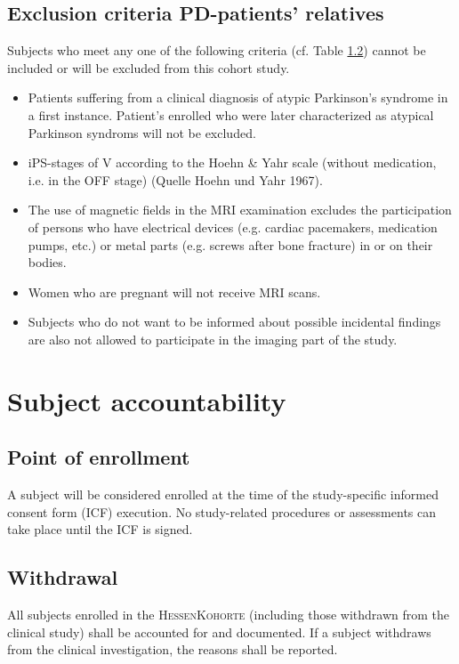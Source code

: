\documentclass[
	a4paper, 
	11.5pt,
	headings=small, 
	twoside, 
	titlepage=firstiscover, 
 	pagesize=auto,
  	version=last,
	open=any,
	BCOR=14mm,
  	chapterprefix=false]{scrbook}
\begin{document}
\subsection{Exclusion criteria \ac{PD}-patients' relatives}
\label{sec:exclusion_criteriaREL}
Subjects who meet any one of the following criteria (cf. Table \ref{}) cannot be included or will be excluded from this cohort study.
\begin{itemize}
\item Patients suffering from a clinical diagnosis of atypic Parkinson's syndrome in a first instance. Patient's enrolled who were later characterized as atypical Parkinson syndroms will not be excluded.
\item \ac{iPS}-stages of V according to the Hoehn \& Yahr scale (without medication, i.e. in the OFF stage) (Quelle Hoehn und Yahr 1967).
\item The use of magnetic fields in the MRI examination excludes the participation of persons who have electrical devices (e.g. cardiac pacemakers, medication pumps, etc.) or metal parts (e.g. screws after bone fracture) in or on their bodies. 
\item Women who are pregnant will not receive \ac{MRI} scans.
\item Subjects who do not want to be informed about possible incidental findings are also not allowed to participate in the imaging part of the study.
\end{itemize}


\section{Subject accountability}

\subsection{Point of enrollment}
A subject will be considered enrolled at the time of the study-specific informed consent form (ICF) execution. No study-related procedures or assessments can take place until the ICF is signed.

\subsection{Withdrawal}
All subjects enrolled in the \textsc{HessenKohorte} (including those withdrawn from the clinical study) shall be accounted for and documented. If a subject withdraws from the clinical investigation, the reasons shall be reported.
\end{document}
